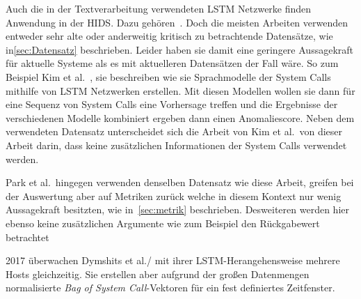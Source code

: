         Auch die in der Textverarbeitung verwendeten \ac{LSTM} Netzwerke finden Anwendung in der \ac{HIDS}.
        Dazu gehören~\cite{LSTMsys, LSTMSURATKAR2019, NIU2020, BIDIRECTIONALLSTMCHAWLA2019, VARIATIONALLSTMBOUZAR2019}.
        Doch die meisten Arbeiten verwenden entweder sehr alte oder anderweitig kritisch zu betrachtende Datensätze, wie in\autoref{sec:Datensatz} beschrieben.
        Leider haben sie damit eine geringere Aussagekraft für aktuelle Systeme als es mit aktuelleren Datensätzen der Fall wäre.
        So zum Beispiel Kim et al.~\cite{LSTMsys}, sie beschreiben wie sie Sprachmodelle der System Calls mithilfe von \ac{LSTM} Netzwerken erstellen.
        Mit diesen Modellen wollen sie dann für eine Sequenz von System Calls eine Vorhersage treffen und die Ergebnisse der verschiedenen Modelle kombiniert ergeben dann einen Anomaliescore.
        Neben dem verwendeten Datensatz unterscheidet sich die Arbeit von Kim et al.\ von dieser Arbeit darin, dass keine zusätzlichen Informationen der System Calls verwendet werden.

        Park et al.\ hingegen verwenden denselben Datensatz wie diese Arbeit, greifen bei der Auswertung aber auf Metriken zurück welche in diesem Kontext nur wenig Aussagekraft besitzten, wie in~\autoref{sec:metrik} beschrieben.
        Desweiteren werden hier ebenso keine zusätzlichen Argumente wie zum Beispiel den Rückgabewert betrachtet~\cite{LSTMPARK2021}

        2017 überwachen Dymshits et al./ mit ihrer LSTM-Herangehensweise mehrere Hosts gleichzeitig.
        Sie erstellen aber aufgrund der großen Datenmengen normalisierte \textit{Bag of System Call}-Vektoren für ein fest definiertes Zeitfenster.~\cite{LSTMDYMSHITS2017}





